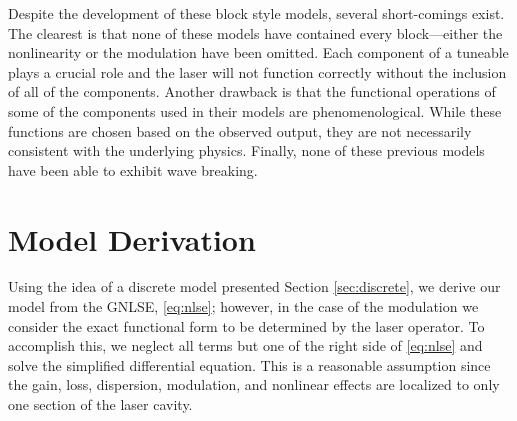 \documentclass[10pt,twocolumn,a4paper]{article}
\begin{document}
Despite the development of these block style models, several short-comings exist. The clearest is that none of these models have contained every block---either the nonlinearity or the modulation have been omitted. Each component of a tuneable plays a crucial role and the laser will not function correctly without the inclusion of all of the components. Another drawback is that the functional operations of some of the components used in their models are phenomenological. While these functions are chosen based on the observed output, they are not necessarily consistent with the underlying physics. Finally, none of these previous models have been able to exhibit wave breaking.


\section{Model Derivation}
\label{sec:model}
Using the idea of a discrete model presented Section \ref{sec:discrete}, we derive our model from the GNLSE, \eqref{eq:nlse}; however, in the case of the modulation we consider the exact functional form to be determined by the laser operator. To accomplish this, we neglect all terms but one of the right side of \eqref{eq:nlse} and solve the simplified differential equation. This is a reasonable assumption since the gain, loss, dispersion, modulation, and nonlinear effects are localized to only one section of the laser cavity.
\end{document}
